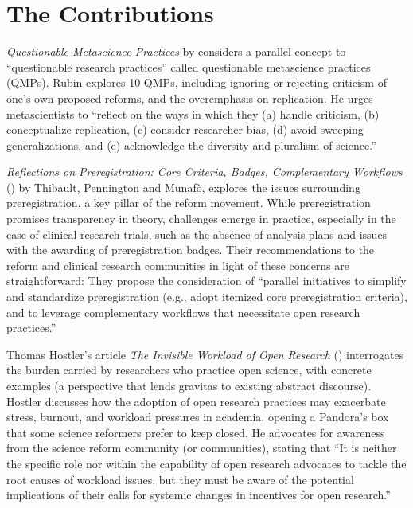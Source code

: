 \documentclass[authordate, editorial, noabstract, issue]{jote-new-article}
\begin{document}
\section{The Contributions}



\emph{Questionable Metascience Practices} by \textcite{Rubin2023} considers a parallel concept to “questionable research practices” called questionable metascience practices (QMPs). Rubin explores 10 QMPs, including ignoring or rejecting criticism of one's own proposed reforms, and the overemphasis on replication. He urges metascientists to “reflect on the ways in which they (a) handle criticism, (b) conceptualize replication, (c) consider researcher bias, (d) avoid sweeping generalizations, and (e) acknowledge the diversity and pluralism of science.”



\emph{Reflections on Preregistration: Core Criteria, Badges, Complementary Workflows }(\hspace*{-2pt}\citeyear{Thibault2023}) by Thibault, Pennington and Munafò, explores the issues surrounding preregistration, a key pillar of the reform movement. While preregistration promises transparency in theory, challenges emerge in practice, especially in the case of clinical research trials, such as the absence of analysis plans and issues with the awarding of preregistration badges. Their recommendations to the reform and clinical research communities in light of these concerns are straightforward: They propose the consideration of “parallel initiatives to simplify and standardize preregistration (e.g., adopt itemized core preregistration criteria), and to leverage complementary workflows that necessitate open research practices.”



Thomas Hostler's article \emph{The Invisible Workload of Open Research} (\hspace*{-2pt}\citeyear{Hostler2023}) interrogates the burden carried by researchers who practice open science, with concrete examples (a perspective that lends gravitas to existing abstract discourse). Hostler discusses how the adoption of open research practices may exacerbate stress, burnout, and workload pressures in academia, opening a Pandora's box that some science reformers prefer to keep closed. He advocates for awareness from the science reform community (or communities), stating that “It is neither the specific role nor within the capability of open research advocates to tackle the root causes of workload issues, but they must be aware of the potential implications of their calls for systemic changes in incentives for open research.”
\end{document}
